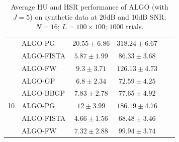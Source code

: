 \begin{table}[h]
\begin{adjustbox}{max width=\textwidth}
\begin{tabular}{|c|l|c|c|c|c|}
                    & ALGO-PG                    & $20.55    \pm 6.86$   & $318.24   \pm 6.67$  \tabularnewline
                    & ALGO-FISTA                 & $5.87     \pm 1.99$   & $86.33    \pm 3.68$  \tabularnewline
                    & ALGO-FW                    & $9.3      \pm 3.71$   & $126.13   \pm 4.73$  \tabularnewline \cline{1-4}
\multirow{5}{*}{10} & ALGO-GP                    & $6.8      \pm 2.34$   & $72.59    \pm 4.25$ \tabularnewline
                    & ALGO-BBGP                  & $7.83     \pm 2.78$   & $77.65    \pm 4.92$ \tabularnewline
                    & ALGO-PG                    & $12       \pm 3.99$   & $186.19   \pm 4.76$ \tabularnewline
                    & ALGO-FISTA                 & $4.66     \pm 1.56$   & $68.48    \pm 3.46$ \tabularnewline
                    & ALGO-FW                    & $7.32     \pm 2.88$   & $99.94    \pm 3.74$ \tabularnewline \cline{1-4}
\end{tabular}
\end{adjustbox}
\caption{Average HU and HSR performance of ALGO (with $J=5$) on synthetic
         data at $20$dB and $10$dB SNR; $N = 16$; $L = 100 \times 100$; $1000$
         trials.}
\label{table:results_full_MO16_SNR2010dB_J5}
\end{table}

\newpage

